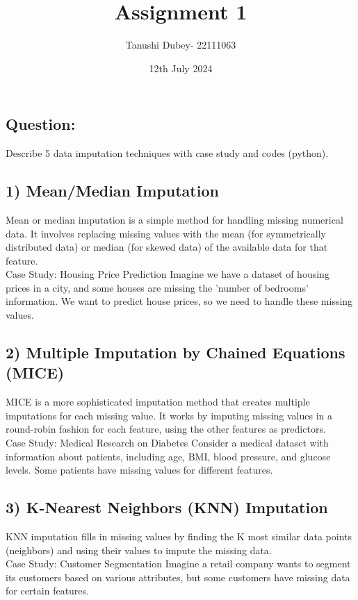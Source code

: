 \documentclass{article}
\title{Assignment 1}
\author{Tanushi Dubey- 22111063}
\date{12th July 2024}
\begin{document}
\maketitle

\subsection*{Question:}
Describe 5 data imputation techniques with case study and codes (python).
\\

\subsection*{1) Mean/Median Imputation}
Mean or median imputation is a simple method for handling missing numerical data. It involves replacing missing values with the mean (for symmetrically distributed data) or median (for skewed data) of the available data for that feature.
\\
Case Study: Housing Price Prediction
Imagine we have a dataset of housing prices in a city, and some houses are missing the 'number of bedrooms' information. We want to predict house prices, so we need to handle these missing values.
\\

\subsection*{2) Multiple Imputation by Chained Equations (MICE)}
MICE is a more sophisticated imputation method that creates multiple imputations for each missing value. It works by imputing missing values in a round-robin fashion for each feature, using the other features as predictors.
\\
Case Study: Medical Research on Diabetes
Consider a medical dataset with information about patients, including age, BMI, blood pressure, and glucose levels. Some patients have missing values for different features.
\\

\subsection*{3) K-Nearest Neighbors (KNN) Imputation}
KNN imputation fills in missing values by finding the K most similar data points (neighbors) and using their values to impute the missing data.
\\
Case Study: Customer Segmentation
Imagine a retail company wants to segment its customers based on various attributes, but some customers have missing data for certain features.
\\
\end{document}
